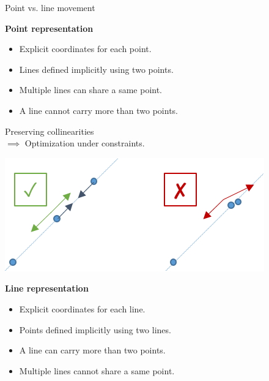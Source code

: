 \begin{frame}[t]{Point vs. line movement}
	\scriptsize
	
	\begin{minipage}{0.6\linewidth}
		\textbf{Point representation}
		\begin{itemize}
			\item Explicit coordinates for each point.
			\item Lines defined implicitly using two points.
		\end{itemize}	
		\begin{itemize}
			\item[\cmark] Multiple lines can share a same point.
			\item[\xmark] A line cannot carry more than two points.
		\end{itemize}
		
		Preserving collinearities \\
		\hspace{0.05cm} $\implies$ Optimization under constraints.
		
	\end{minipage}%
	\begin{minipage}{0.4\linewidth}
		\includegraphics[width=\linewidth]{point_mouvement}
	\end{minipage}

	\vspace{0.5cm}
	\pause
	
	\textbf{Line representation}
	\begin{itemize}
		\item Explicit coordinates for each line.
		\item Points defined implicitly using two lines.
	\end{itemize}
	\begin{itemize}
		\item[\cmark] A line can carry more than two points.
		\item[\xmark] Multiple lines cannot share a same point.
	\end{itemize}
\end{frame}

